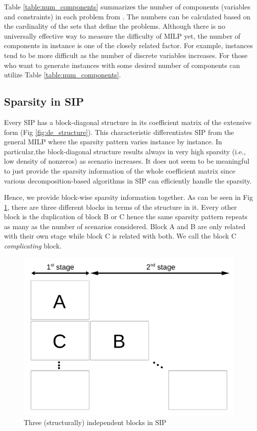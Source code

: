 Table \ref{table:num_components} summarizes the number of components (variables and constraints) in each problem from \siplibtwo. The numbers can be calculated based on the cardinality of the sets that define the problems. Although there is no universally effective way to measure the difficulty of MILP yet, the number of components in instance is one of the closely related factor. For example, instances tend to be more difficult as the number of discrete variables increases. For those who want to generate instances with some desired number of components can utilize Table \ref{table:num_components}.



\subsection{Sparsity in SIP}
Every SIP has a block-diagonal structure in its coefficient matrix of the extensive form (Fig \ref{fig:de_structure}). This characteristic differentiates SIP from the general MILP where the sparsity pattern varies instance by instance. In particular,the block-diagonal structure results always in very high sparsity (i.e., low density of nonzeros) as scenario increases. It does not seem to be meaningful to just provide the sparsity information of the whole coefficient matrix since various decomposition-based algorithms in SIP can efficiently handle the sparsity. 

Hence, we provide block-wise sparsity information together. As can be seen in Fig \ref{fig:stagewise_sparsity}, there are three different blocks in terms of the structure in it. Every other block is the duplication of block B or C hence the same sparsity pattern repeats as many as the number of scenarios considered. Block A and B are only related with their own stage while block C is related with both. We call the block C \textit{complicating} block. 



\begin{figure}
	\centering
	\includegraphics[width=0.7\linewidth]{drawings/stagewise_sparsity}
	\caption{Three (structurally) independent blocks in SIP}
	\label{fig:stagewise_sparsity}
\end{figure}







